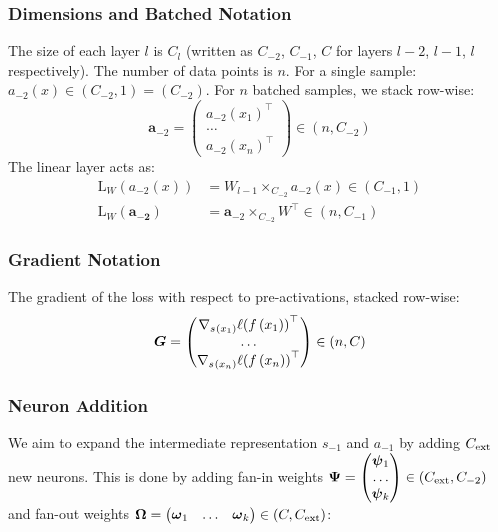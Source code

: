 \subsubsection{Dimensions and Batched Notation}

The size of each layer \(l\) is \(C_{l}\) (written as \(C_{- 2}\),
\(C_{- 1}\), \(C\) for layers \(l - 2\), \(l - 1\), \(l\) respectively).
The number of data points is \(n\). For a single sample:
\(a_{- 2}(x) \in \left( C_{- 2},1 \right) = \left( C_{- 2} \right)\). For \(n\) batched samples, we stack row-wise:
\[
    \mathbf{a}_{- 2} = \begin{pmatrix}
    {a_{- 2}(x_{1})}^{\top} \\
    \ldots \\
    {a_{- 2}(x_{n})}^{\top}
    \end{pmatrix} \in \left( n,C_{- 2} \right)
\]
The linear layer acts as: \[\begin{aligned}
\mathrm{L}_{W}(a_{- 2}(x)) & = W_{l - 1} \times_{C_{- 2}}a_{- 2}(x) \in \left( C_{- 1},1 \right) \\
\mathrm{L}_{W}(\mathbf{\mathbf{a}_{- 2}}) & = \mathbf{a}_{- 2} \times_{C_{- 2}}W^{\top} \in \left( n,C_{- 1} \right)
\end{aligned}\]

\subsubsection{Gradient Notation}

The gradient of the loss with respect to pre-activations, stacked
row-wise: \[\boldsymbol{G} = \begin{pmatrix}
{\nabla_{s_{}(x_{1})}\ell(f\left( x_{1} \right))}^{\top} \\
\ldots \\
{\nabla_{s_{}(x_{n})}\ell(f\left( x_{n} \right))}^{\top}
\end{pmatrix} \in (n,C)\]

\subsubsection{Neuron Addition}

We aim to expand the intermediate representation \(s_{- 1}\) and
\(a_{- 1}\) by adding \(C_{\text{ext}}\) new neurons. This is done by adding
fan-in weights \(\boldsymbol{\Psi}{} = \begin{pmatrix}
\boldsymbol{\psi}{}_{1} \\
\ldots \\
\boldsymbol{\psi}{}_{k}
\end{pmatrix} \in \left( C_{\text{ext}},C_{- 2} \right)\) and fan-out weights
\(\boldsymbol{\Omega}{} = \begin{pmatrix}
\boldsymbol{\omega}{}_{1} & \ldots & \boldsymbol{\omega}{}_{k}
\end{pmatrix} \in \left( C,C_{\text{ext}} \right)\):

